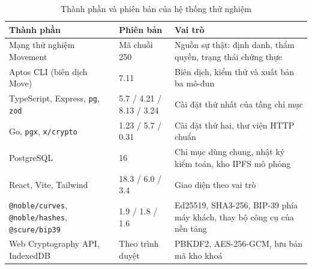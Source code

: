 \begin{table}[H]
\centering
\caption{Thành phần và phiên bản của hệ thống thử nghiệm}
\label{tab:v2-env}
\renewcommand{\arraystretch}{1.2}
\small
\begin{tabular}{|p{3.6cm}|p{2.5cm}|p{7.2cm}|}
\hline
\textbf{Thành phần} & \textbf{Phiên bản} & \textbf{Vai trò} \\ \hline
Mạng thử nghiệm Movement & Mã chuỗi 250 & Nguồn sự thật: định danh, thẩm quyền, trạng thái chứng thực \\ \hline
Aptos CLI (biên dịch Move) & 7.11 & Biên dịch, kiểm thử và xuất bản ba mô-đun \\ \hline
TypeScript, Express, \texttt{pg}, \texttt{zod} & 5.7 / 4.21 / 8.13 / 3.24 & Cài đặt thứ nhất của tầng chỉ mục \\ \hline
Go, \texttt{pgx}, \texttt{x/crypto} & 1.23 / 5.7 / 0.31 & Cài đặt thứ hai, thư viện HTTP chuẩn \\ \hline
PostgreSQL & 16 & Chỉ mục dùng chung, nhật ký kiểm toán, kho IPFS mô phỏng \\ \hline
React, Vite, Tailwind & 18.3 / 6.0 / 3.4 & Giao diện theo vai trò \\ \hline
\texttt{@noble/curves}, \texttt{@noble/hashes}, \texttt{@scure/bip39} & 1.9 / 1.8 / 1.6 & Ed25519, SHA3-256, BIP-39 phía máy khách, thay bộ công cụ của nền tảng \\ \hline
Web Cryptography API, IndexedDB & Theo trình duyệt & PBKDF2, AES-256-GCM, lưu bản mã kho khoá \\ \hline
\end{tabular}
\end{table}
